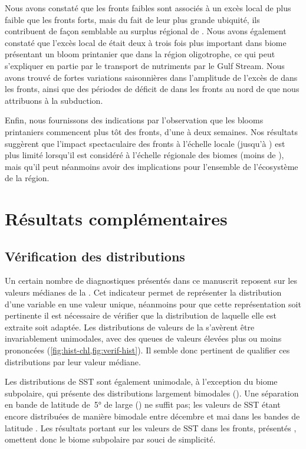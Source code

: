 Nous avons constaté que les fronts faibles sont associés à un excès local de  plus faible que les fronts forts, mais du fait de leur plus grande ubiquité, ils contribuent de façon semblable au surplus régional de .
Nous avons également constaté que l'excès local de  était deux à trois fois plus important dans biome présentant un bloom printanier que dans la région oligotrophe, ce qui peut s'expliquer en partie par le transport de nutriments par le Gulf Stream.
Nous avons trouvé de fortes variations saisonnières dans l'amplitude de l'excès de  dans les fronts, ainsi que des périodes de déficit de  dans les fronts au nord de  que nous attribuons à la subduction.

Enfin, nous fournissons des indications par l'observation que les blooms printaniers commencent plus tôt des fronts, d'une à deux semaines.
Nos résultats suggèrent que l'impact spectaculaire des fronts à l'échelle locale (jusqu'à ) est plus limité lorsqu'il est considéré à l'échelle régionale des biomes (moins de ), mais qu'il peut néanmoins avoir des implications pour l'ensemble de l'écosystème de la région.

\insertArticle{}

\section{Résultats complémentaires}
\label{sec:complements-chl}
\suppressfloats[t]

\subsection{Vérification des distributions}
\label{sec:verif-hist}

Un certain nombre de diagnostiques présentés dans ce manuscrit reposent sur les valeurs médianes de la .
Cet indicateur permet de représenter la distribution d'une variable en une valeur unique, néanmoins pour que cette représentation soit pertinente il est nécessaire de vérifier que la distribution de laquelle elle est extraite soit adaptée.
Les distributions de valeurs de la  s'avèrent être invariablement unimodales, avec des queues de valeurs élevées plus ou moins prononcées (\cref{fig:hist-chl,fig:verif-hist}).
Il semble donc pertinent de qualifier ces distributions par leur valeur médiane.

Les distributions de SST sont également unimodale, à l'exception du biome subpolaire, qui présente des distributions largement bimodales ().
Une séparation en bande de latitude de~\ang{5} de large () ne suffit pas; les valeurs de SST étant encore distribuées de manière bimodale entre décembre et mai dans les bandes de latitude .
Les résultats portant sur les valeurs de SST dans les fronts, présentés , omettent donc le biome subpolaire par souci de simplicité.

